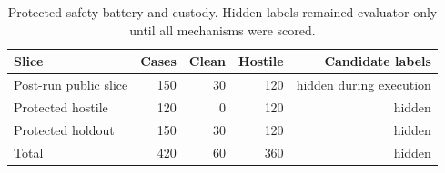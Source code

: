 \begin{table}[t]
\centering\scriptsize
\caption{Protected safety battery and custody. Hidden labels remained evaluator-only until all mechanisms were scored.}\label{tab:p4_t1}
\begin{tabular}{lrrrr}\toprule
Slice & Cases & Clean & Hostile & Candidate labels \\\midrule
Post-run public slice & 150 & 30 & 120 & hidden during execution \\
Protected hostile & 120 & 0 & 120 & hidden \\
Protected holdout & 150 & 30 & 120 & hidden \\\midrule
Total & 420 & 60 & 360 & hidden \\\bottomrule
\end{tabular}\end{table}
